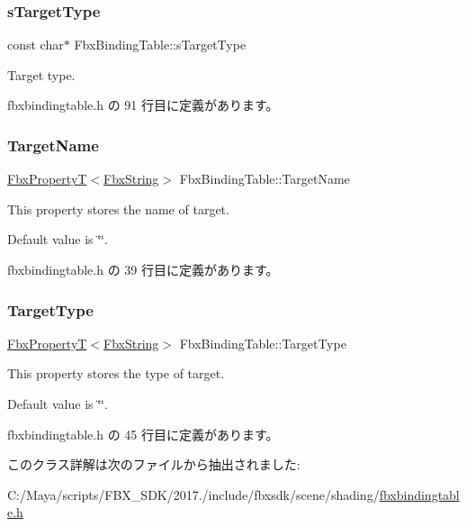 \mbox{\label{class_fbx_binding_table_ad9d25de472ef5c70e26293f768d1184f}} 
\subsubsection{\texorpdfstring{s\+Target\+Type}{sTargetType}}
{\footnotesize\ttfamily const char$\ast$ Fbx\+Binding\+Table\+::s\+Target\+Type\hspace{0.3cm}{\ttfamily [static]}}



Target type. 



 fbxbindingtable.\+h の 91 行目に定義があります。

\mbox{\label{class_fbx_binding_table_a09ebb43f4fdfafcf1842ecad60b16801}} 
\subsubsection{\texorpdfstring{Target\+Name}{TargetName}}
{\footnotesize\ttfamily \hyperlink{class_fbx_property_t}{Fbx\+PropertyT}$<$\hyperlink{class_fbx_string}{Fbx\+String}$>$ Fbx\+Binding\+Table\+::\+Target\+Name}

This property stores the name of target.

Default value is \char`\"{}\char`\"{}. 

 fbxbindingtable.\+h の 39 行目に定義があります。

\mbox{\label{class_fbx_binding_table_aca964aac5ddc2238ca9d4a3cafe42486}} 
\subsubsection{\texorpdfstring{Target\+Type}{TargetType}}
{\footnotesize\ttfamily \hyperlink{class_fbx_property_t}{Fbx\+PropertyT}$<$\hyperlink{class_fbx_string}{Fbx\+String}$>$ Fbx\+Binding\+Table\+::\+Target\+Type}

This property stores the type of target.

Default value is \char`\"{}\char`\"{}. 

 fbxbindingtable.\+h の 45 行目に定義があります。



このクラス詳解は次のファイルから抽出されました\+:\begin{DoxyCompactItemize}
\item 
C\+:/\+Maya/scripts/\+F\+B\+X\+\_\+\+S\+D\+K/2017./include/fbxsdk/scene/shading/\hyperlink{fbxbindingtable_8h}{fbxbindingtable.\+h}\end{DoxyCompactItemize}
